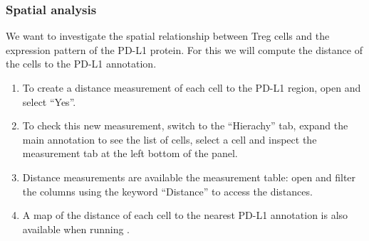 \documentclass[a4paper,DIV=17,dvipsnames,headsepline]{scrartcl}
\begin{document}
\subsubsection{Spatial analysis}
We want to investigate the spatial relationship between Treg cells and the expression pattern of the PD-L1 protein. For this we will compute the distance of the cells to the PD-L1 annotation.
\begin{enumerate}
\item To create a distance measurement of each cell to the PD-L1 region, open  and select ``Yes''.
\item To check this new measurement, %
switch to the ``Hierachy'' tab, expand the main annotation to see the list of cells, select a cell and inspect the measurement tab at the left bottom of the panel. 
\item Distance measurements are available the measurement table: open  and filter the columns using the keyword ``Distance'' to access the distances.
\item A map of the distance of each cell to the nearest PD-L1 annotation is also available when running .
\end{enumerate}


\end{document}
